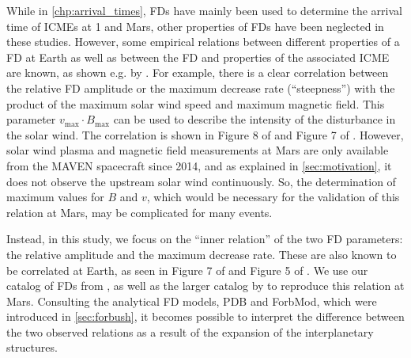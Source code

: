 While in \autoref{chp:arrival_times}, \acp{FD} have mainly been used to determine the arrival time of \acp{ICME} at \SI{1}{\AU} and Mars, other properties of \acp{FD} have been neglected in these studies. However, some empirical relations between different properties of a \ac{FD} at Earth as well as between the \ac{FD} and properties of the associated \ac{ICME} are known, as shown e.g. by \citet{Belov-2008-FD,Abunin-2012-FD}. For example, there is a clear correlation between the relative \ac{FD} amplitude or the maximum decrease rate (``steepness'') with the product of the maximum solar wind speed and maximum magnetic field. This parameter $v_\text{max} \cdot B_\text{max}$ can be used to describe the intensity of the disturbance in the solar wind. The correlation is shown in Figure 8 of \citet{Belov-2008-FD} and Figure 7 of \citet{Abunin-2012-FD}.
However, solar wind plasma and magnetic field measurements at Mars are only available from the \ac{MAVEN} spacecraft since 2014, and as explained in \autoref{sec:motivation}, it does not observe the upstream solar wind continuously. So, the determination of maximum values for $B$ and $v$, which would be necessary for the validation of this relation at Mars, may be complicated for many events.

Instead, in this study, we focus on the ``inner relation'' of the two FD parameters: the relative amplitude and the maximum decrease rate. These are also known to be correlated at Earth, as seen in Figure 7 of \citet{Belov-2008-FD} and Figure 5 of \citet{Abunin-2012-FD}. We use our catalog of \acp{FD} from \citet{Forstner-2019}, as well as the larger catalog by \citet{Papaioannou-2019-FD-Earth-Mars} to reproduce this relation at Mars. Consulting the analytical \ac{FD} models, \acs{PDB} and \acs{ForbMod}, which were introduced in \autoref{sec:forbush}, it becomes possible to interpret the difference between the two observed relations as a result of the expansion of the interplanetary structures.

